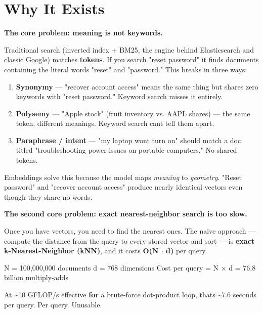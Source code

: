 \documentclass[11pt]{article}
\providecommand{\tightlist}{\setlength{\itemsep}{1pt}\setlength{\parskip}{0pt}}
\newenvironment{Shaded}{\begin{snugshade}}{\end{snugshade}}
\newcommand{\ControlFlowTok}[1]{\textcolor[rgb]{0.99,0.74,0.29}{\textbf{#1}}}
\newcommand{\DecValTok}[1]{\textcolor[rgb]{0.96,0.45,0.00}{#1}}
\newcommand{\FloatTok}[1]{\textcolor[rgb]{0.96,0.45,0.00}{#1}}
\newcommand{\NormalTok}[1]{\textcolor[rgb]{0.81,0.81,0.76}{#1}}
\newcommand{\OperatorTok}[1]{\textcolor[rgb]{0.81,0.81,0.76}{#1}}
\newcommand{\StringTok}[1]{\textcolor[rgb]{0.96,0.31,0.31}{#1}}
\begin{document}
\section{Why It Exists}\label{why-it-exists}

\textbf{The core problem: meaning is not keywords.}

Traditional search (inverted index + BM25, the engine behind Elasticsearch and classic Google) matches \textbf{tokens}. If you search "reset password" it finds documents containing the literal words "reset" and "password." This breaks in three ways:

\begin{enumerate}
\def\labelenumi{\arabic{enumi}.}
\tightlist
\item
  \textbf{Synonymy} --- "recover account access" means the same thing but shares zero keywords with "reset password." Keyword search misses it entirely.
\item
  \textbf{Polysemy} --- "Apple stock" (fruit inventory vs. AAPL shares) --- the same token, different meanings. Keyword search can\textquotesingle t tell them apart.
\item
  \textbf{Paraphrase / intent} --- "my laptop won\textquotesingle t turn on" should match a doc titled "troubleshooting power issues on portable computers." No shared tokens.
\end{enumerate}

Embeddings solve this because the model maps \emph{meaning} to \emph{geometry}. "Reset password" and "recover account access" produce nearly identical vectors even though they share no words.

\textbf{The second core problem: exact nearest-neighbor search is too slow.}

Once you have vectors, you need to find the nearest ones. The naive approach --- compute the distance from the query to every stored vector and sort --- is \textbf{exact k-Nearest-Neighbor (kNN)}, and it costs \textbf{O(N \(\cdot\) d)} per query.


\begin{Shaded}
\begin{Highlighting}[]
\NormalTok{N }\OperatorTok{=} \DecValTok{100}\NormalTok{,}\DecValTok{000}\NormalTok{,}\DecValTok{000}\NormalTok{ documents}
\NormalTok{d }\OperatorTok{=} \DecValTok{768}\NormalTok{ dimensions}
\NormalTok{Cost per query }\OperatorTok{=}\NormalTok{ N × d }\OperatorTok{=} \FloatTok{76.8}\NormalTok{ billion multiply}\OperatorTok{{-}}\NormalTok{adds}

\NormalTok{At }\OperatorTok{\textasciitilde{}}\DecValTok{10}\NormalTok{ GFLOP}\OperatorTok{/}\NormalTok{s effective }\ControlFlowTok{for}\NormalTok{ a brute}\OperatorTok{{-}}\NormalTok{force dot}\OperatorTok{{-}}\NormalTok{product loop,}
\NormalTok{that}\StringTok{\textquotesingle{}s \textasciitilde{}7.6 seconds per query. Per query. Unusable.}
\end{Highlighting}
\end{Shaded}
\end{document}

